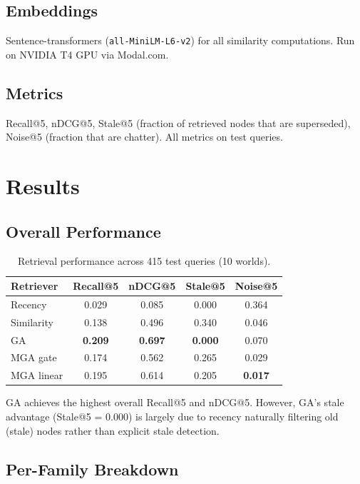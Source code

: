 \documentclass[11pt,a4paper]{article}
\begin{document}
\subsection{Embeddings}

Sentence-transformers (\texttt{all-MiniLM-L6-v2}) for all similarity computations. Run on NVIDIA T4 GPU via Modal.com.

\subsection{Metrics}

Recall@5, nDCG@5, Stale@5 (fraction of retrieved nodes that are superseded), Noise@5 (fraction that are chatter). All metrics on test queries.

\section{Results}

\subsection{Overall Performance}

\begin{table}[h]
\centering
\caption{Retrieval performance across 415 test queries (10 worlds).}
\begin{tabular}{lcccc}
\toprule
\textbf{Retriever} & \textbf{Recall@5} & \textbf{nDCG@5} & \textbf{Stale@5} & \textbf{Noise@5} \\
\midrule
Recency & 0.029 & 0.085 & 0.000 & 0.364 \\
Similarity & 0.138 & 0.496 & 0.340 & 0.046 \\
GA & \textbf{0.209} & \textbf{0.697} & \textbf{0.000} & 0.070 \\
MGA gate & 0.174 & 0.562 & 0.265 & 0.029 \\
MGA linear & 0.195 & 0.614 & 0.205 & \textbf{0.017} \\
\bottomrule
\end{tabular}
\end{table}

GA achieves the highest overall Recall@5 and nDCG@5. However, GA's stale advantage (Stale@5 = 0.000) is largely due to recency naturally filtering old (stale) nodes rather than explicit stale detection.

\subsection{Per-Family Breakdown}
\end{document}
